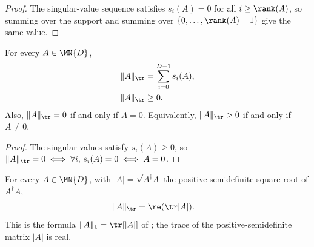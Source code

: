 \begin{proof}\leanok
    The singular-value sequence satisfies $s_i(A)=0$ for all
    $i\geq\rank(A)$, so summing over the support and summing
    over $\{0,\ldots,\rank(A)-1\}$ give the same value.
\end{proof}

\begin{theorem}
    \label{thm:trace_norm_elementary}
    \leanok
    For every $A\in\MN{D}$,
    \begin{align}
        \lVert A\rVert_{\tr}
        &=\sum_{i=0}^{D-1}s_i(A),
        \label{eq:entropy_trace_norm_fin}\\
        \lVert A\rVert_{\tr}
        &\geq 0.
        \notag
    \end{align}
    Also, $\lVert A\rVert_{\tr}=0$ if and only if $A=0$.
    Equivalently, $\lVert A\rVert_{\tr}>0$ if and only if $A\neq0$.
\end{theorem}

\begin{proof}\leanok
    The singular values satisfy $s_i(A)\geq0$, so
    $\lVert A\rVert_{\tr}=0
    \iff \forall i,\,s_i(A)=0
    \iff A=0$.
\end{proof}

\begin{theorem}
    \label{thm:trace_norm_abs}
    \leanok
    For every $A\in\MN{D}$, with
    $\lvert A\rvert=\sqrt{A^\dagger A}$ the positive-semidefinite square root
    of $A^\dagger A$,
    \begin{align}
        \lVert A\rVert_{\tr}
        &=\re(\tr\lvert A\rvert).
        \label{eq:entropy_trace_norm_abs}
    \end{align}
    This is the formula $\lVert A\rVert_1=\tr[\lvert A\rvert]$
    of \cite[Chapter~8, Section~8.1]{Wolf2012Quantum}; the trace of the
    positive-semidefinite matrix $\lvert A\rvert$ is real.
\end{theorem}

